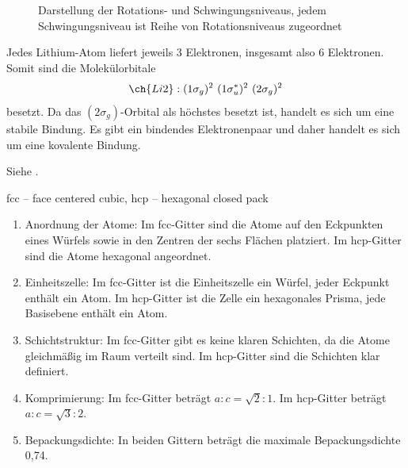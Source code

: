 \begin{figure}[H]
\begin{minipage}[b]{.4\linewidth}
      \caption{Darstellung der Rotations- und Schwingungsniveaus, jedem Schwingungsniveau ist Reihe von Rotationsniveaus zugeordnet}
   \end{minipage}
    \end{figure}


\label{q:44}

Jedes Lithium-Atom liefert jeweils 3 Elektronen, insgesamt also 6 Elektronen. 
Somit sind die Molekülorbitale
\[\ch{Li2} : (1\sigma_g)^2 ~ (1\sigma_u^*)^2 ~ (2\sigma_g)^2\]
besetzt. 
Da das $(2\sigma_g)$-Orbital als höchstes besetzt ist, handelt es sich um eine stabile Bindung. 
Es gibt ein bindendes Elektronenpaar und daher handelt es sich um eine kovalente Bindung.

\label{q:45}

Siehe .

\label{q:46}

fcc -- face centered cubic, hcp -- hexagonal closed pack

\begin{enumerate}
    \item Anordnung der Atome: Im fcc-Gitter sind die Atome auf den Eckpunkten eines Würfels sowie in den Zentren der sechs Flächen platziert. Im hcp-Gitter sind die Atome hexagonal angeordnet.
    \item Einheitszelle: Im fcc-Gitter ist die Einheitszelle ein Würfel, jeder Eckpunkt enthält ein Atom. Im hcp-Gitter ist die Zelle ein hexagonales Prisma, jede Basisebene enthält ein Atom.
    \item Schichtstruktur: Im fcc-Gitter gibt es keine klaren Schichten, da die Atome gleichmäßig im Raum verteilt sind. Im hcp-Gitter sind die Schichten klar definiert.
    \item Komprimierung: Im fcc-Gitter beträgt $a:c = \sqrt{2}:1$. Im hcp-Gitter beträgt $a:c = \sqrt{3}:2$.
    \item Bepackungsdichte: In beiden Gittern beträgt die maximale Bepackungsdichte 0,74.
\end{enumerate}

\label{q:47}

